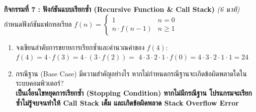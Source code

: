 \documentclass[a4paper,12pt]{article}
\newcommand{\ans}[1]{\textbf{\color{ans}#1}}
\begin{document}
\noindent\textbf{กิจกรรมที่ 7 : ฟังก์ชันแบบเรียกซ้ำ (Recursive Function \& Call Stack)} \hfill \textit{(6 นาที)}\\
กำหนดฟังก์ชันแฟกทอเรียล $f(n) = \begin{cases} 1 & n = 0 \\ n \cdot f(n-1) & n \ge 1 \end{cases}$
\begin{enumerate}[label=\arabic*)]
  \item จงเขียนลำดับการขยายการเรียกซ้ำและคำนวณค่าของ $f(4)$:\\[0.15em]
        $f(4) = 4 \cdot f(3) = 4 \cdot (3 \cdot f(2)) =$ \ans{$4 \cdot 3 \cdot 2 \cdot 1 \cdot f(0) = 4 \cdot 3 \cdot 2 \cdot 1 \cdot 1 = 24$}
  \item กรณีฐาน (Base Case) มีความสำคัญอย่างไร หากไม่กำหนดกรณีฐานจะเกิดข้อผิดพลาดใดในระบบคอมพิวเตอร์?\\[0.15em]
        \ans{เป็นเงื่อนไขหยุดการเรียกซ้ำ (Stopping Condition) หากไม่มีกรณีฐาน โปรแกรมจะเรียกซ้ำไม่รู้จบจนทำให้ Call Stack เต็ม และเกิดข้อผิดพลาด Stack Overflow Error}
\end{enumerate}
\end{document}

